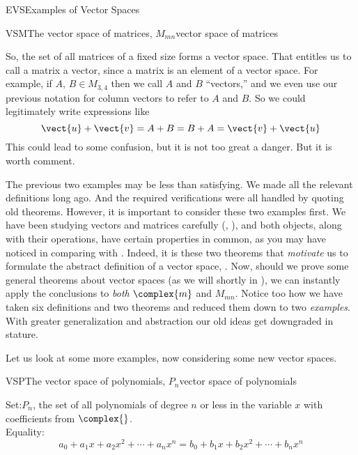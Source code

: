 \begin{subsect}{EVS}{Examples of Vector Spaces}
\begin{example}{VSM}{The vector space of matrices, $M_{mn}$}{vector space of matrices}
\end{example}
%
\begin{para}So, the set of all matrices of a fixed size forms a vector space.  That entitles us to call a matrix a vector, since a matrix is an element of a vector space.  For example, if $A,\,B\in M_{3,4}$ then we call $A$ and $B$ ``vectors,'' and we even use our previous notation for column vectors to refer to $A$ and $B$.  So we could legitimately write expressions like
%
\begin{equation*}
\vect{u}+\vect{v}=A+B=B+A=\vect{v}+\vect{u}
\end{equation*}
%
This could lead to some confusion, but it is not too great a danger.  But it is worth comment.\end{para}
%
\begin{para}The previous two examples may be less than satisfying.  We made all the relevant definitions long ago.  And the required verifications were all handled by quoting old theorems.  However, it is important to consider these two examples first.  We have been studying vectors and matrices carefully (, ), and both objects, along with their operations, have certain properties in common, as you may have noticed in comparing  with .  Indeed, it is these two theorems that {\em motivate} us to formulate the abstract definition of a vector space, .  Now, should we prove some general theorems about vector spaces (as we will shortly in ), we can instantly apply the conclusions to {\em both} $\complex{m}$ and $M_{mn}$.  Notice too how we have taken six definitions and two theorems and reduced them down to two {\em examples}.  With greater generalization and abstraction our old ideas get downgraded in stature.\end{para}
%
\begin{para}Let us look at some more examples, now considering some new vector spaces.\end{para}
%
\begin{example}{VSP}{The vector space of polynomials, $P_n$}{vector space of polynomials}
\begin{para}Set:\quad $P_n$, the set of all polynomials of degree $n$ or less in the variable $x$ with coefficients from $\complex{\null}$.\\
Equality:
%
\begin{equation*}
a_0+a_1x+a_2x^2+\cdots+a_nx^n=b_0+b_1x+b_2x^2+\cdots+b_nx^n

\end{equation*}
\end{para}
\end{example}
\end{subsect}
